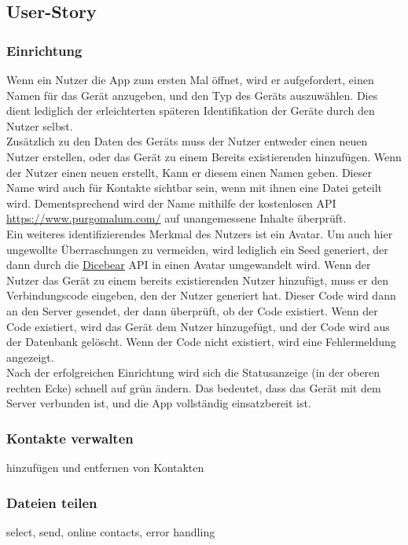 \documentclass[a4paper]{article}
\begin{document}
\subsection{User-Story}

\subsubsection{Einrichtung}
Wenn ein Nutzer die App zum ersten Mal öffnet, wird er aufgefordert, einen Namen
für das Gerät anzugeben, und den Typ des Geräts auszuwählen. Dies dient
lediglich der erleichterten späteren Identifikation der Geräte durch den Nutzer
selbst.\\
Zusätzlich zu den Daten des Geräts muss der Nutzer entweder einen neuen Nutzer
erstellen, oder das Gerät zu einem Bereits existierenden hinzufügen. Wenn der
Nutzer einen neuen erstellt, Kann er diesem einen Namen geben. Dieser Name wird
auch für Kontakte sichtbar sein, wenn mit ihnen eine Datei geteilt wird.
Dementsprechend wird der Name mithilfe der kostenlosen API \url{
  https://www.purgomalum.com/} auf unangemessene Inhalte überprüft.\\
Ein weiteres identifizierendes Merkmal des Nutzers ist ein Avatar. Um auch hier
ungewollte Überraschungen zu vermeiden, wird lediglich ein Seed generiert, der
dann durch die \href{ https://www.dicebear.com/}{Dicebear} API in einen Avatar
umgewandelt wird. Wenn der Nutzer das Gerät zu einem bereits existierenden
Nutzer hinzufügt, muss er den Verbindungscode eingeben, den der Nutzer generiert
hat. Dieser Code wird dann an den Server gesendet, der dann überprüft, ob der
Code existiert. Wenn der Code existiert, wird das Gerät dem Nutzer hinzugefügt,
und der Code wird aus der Datenbank gelöscht. Wenn der Code nicht existiert,
wird eine Fehlermeldung angezeigt.\\
Nach der erfolgreichen Einrichtung wird sich die Statusanzeige (in der oberen
rechten Ecke) schnell auf grün ändern. Das bedeutet, dass das Gerät mit dem
Server verbunden ist, und die App vollständig einsatzbereit ist.

\subsubsection{Kontakte verwalten}

hinzufügen und entfernen von Kontakten

\subsubsection{Dateien teilen}
select, send, online contacts, error handling
\end{document}
